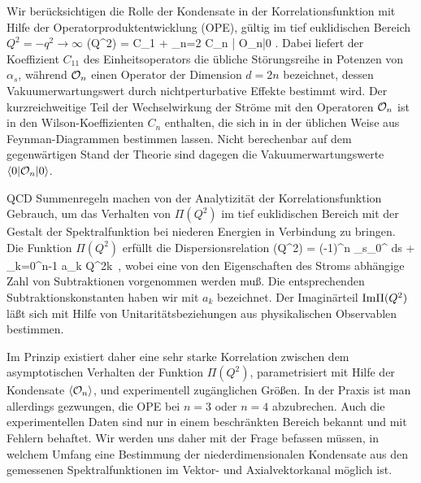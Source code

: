 Wir ber\"ucksichtigen die
Rolle der Kondensate in der Korrelationsfunktion mit Hilfe
der Operatorproduktentwicklung (OPE), g\"ultig im tief
euklidischen Bereich $Q^2=-q^2\to\infty$
\be
\label{ope}
 \Pi (Q^2) =  C_{1\!}  + \sum_{n=2} 
        C_n | {\cal O}_n|0\rangle  \; .
\ee
Dabei liefert der Koeffizient $C_{1\!\!1}$ des Einheitsoperators
die \"ubliche St\"orungsreihe in Potenzen von $\alpha_s$,
w\"ahrend ${\cal O}_n$ einen Operator der Dimension $d=2n$
bezeichnet, dessen Vakuumerwartungswert durch nichtperturbative
Effekte bestimmt wird. Der kurzreichweitige Teil der 
Wechselwirkung der Str\"ome mit den Operatoren ${\cal O}_n$ ist
in den Wilson-Koeffizienten $C_n$ enthalten, die sich in 
in der \"ublichen Weise aus Feynman-Diagrammen bestimmen lassen. 
Nicht berechenbar auf dem gegenw\"artigen Stand der Theorie sind 
dagegen die  Vakuumerwartungswerte $\langle 0|{\cal O}_n|0\rangle $.

QCD Summenregeln machen von der Analytizit\"at der 
Korrelationsfunktion Gebrauch, um das Verhalten von $\Pi (Q^2)$ 
im tief euklidischen Bereich mit der Gestalt der Spektralfunktion 
bei niederen Energien in Verbindung zu bringen. Die Funktion 
$\Pi (Q^2)$ erf\"ullt die Dispersionsrelation 
\be 
\label{disprel}
 \Pi (Q^2) = (-1)^n  \int_{s_0}^{\infty}
     ds +
    \sum_{k=0}^{n-1} a_k Q^{2k}\, ,
\ee
wobei eine von den Eigenschaften des Stroms abh\"angige Zahl von 
Subtraktionen vorgenommen werden mu\ss .  Die entsprechenden  
Subtraktionskonstanten haben wir mit $a_k$ bezeichnet. 
Der Imagin\"arteil ${\rm Im}\Pi (Q^2)$ l\"a\ss t sich mit
Hilfe von  Unitarit\"atsbeziehungen aus physikalischen
Observablen bestimmen.

Im Prinzip existiert daher eine sehr starke Korrelation zwischen 
dem asymptotischen Verhalten der Funktion $\Pi (Q^2)$, parametrisiert
mit Hilfe der Kondensate $\langle {\cal O}_n\rangle $, und experimentell 
zug\"anglichen Gr\"o\ss en. In der Praxis ist man allerdings 
gezwungen, die OPE bei $n=3$ oder $n=4$ abzubrechen. Auch die
experimentellen Daten sind nur in einem beschr\"ankten Bereich 
bekannt und mit Fehlern behaftet. Wir werden uns daher mit der 
Frage befassen m\"ussen, in welchem Umfang eine Bestimmung der 
niederdimensionalen Kondensate aus den gemessenen Spektralfunktionen 
im Vektor- und Axialvektorkanal m\"oglich ist. 

